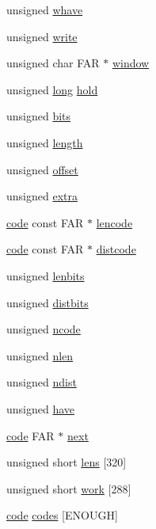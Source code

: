 \begin{DoxyCompactItemize}
unsigned \hyperlink{structinflate__state_a6b56aabe80412784eadc1068981c9d00}{whave}
\item 
unsigned \hyperlink{structinflate__state_a8b89588c1a322e622ebb694d8daa644c}{write}
\item 
unsigned char F\-A\-R $\ast$ \hyperlink{structinflate__state_a9cc4c0bde426383731394dcf91c40673}{window}
\item 
unsigned \hyperlink{ioapi_8h_a3c7b35ad9dab18b8310343c201f7b27e}{long} \hyperlink{structinflate__state_a5a91b1c59e52f1aa7eda75b86b05b843}{hold}
\item 
unsigned \hyperlink{structinflate__state_ab37c3563f306f29e6ded8e933af14365}{bits}
\item 
unsigned \hyperlink{structinflate__state_a5179d4c9b332d976cce7c6cce6bdf3c1}{length}
\item 
unsigned \hyperlink{structinflate__state_af1e38258e8585b1a37854066ef9d939c}{offset}
\item 
unsigned \hyperlink{structinflate__state_a5b7b0be77d61e8468716c7f265dd0780}{extra}
\item 
\hyperlink{structcode}{code} const F\-A\-R $\ast$ \hyperlink{structinflate__state_a4560e1eb3318f7ea41896be84de0679a}{lencode}
\item 
\hyperlink{structcode}{code} const F\-A\-R $\ast$ \hyperlink{structinflate__state_a19f7ae2fe2682cb1163860f6991a107f}{distcode}
\item 
unsigned \hyperlink{structinflate__state_a3ff97e6b230d7551fc848ff9de0236e9}{lenbits}
\item 
unsigned \hyperlink{structinflate__state_a98952f3f8f420a05b567f080aca0eb4b}{distbits}
\item 
unsigned \hyperlink{structinflate__state_a62b5ea8559856b315b6c89d9114c2109}{ncode}
\item 
unsigned \hyperlink{structinflate__state_a489b005f4fe214353cd80b77b4f23194}{nlen}
\item 
unsigned \hyperlink{structinflate__state_a4415e5e51efdd0c8672e4c601caa4762}{ndist}
\item 
unsigned \hyperlink{structinflate__state_a4a2b15912256bcf7b39980e15095ba58}{have}
\item 
\hyperlink{structcode}{code} F\-A\-R $\ast$ \hyperlink{structinflate__state_a872bf267d91efb4143e9cfb812e670bb}{next}
\item 
unsigned short \hyperlink{structinflate__state_aa0620e64487c48635f6c3a11a0aeb99d}{lens} \mbox{[}320\mbox{]}
\item 
unsigned short \hyperlink{structinflate__state_a85403907f7f5b9d355821ffa2591456c}{work} \mbox{[}288\mbox{]}
\item 
\hyperlink{structcode}{code} \hyperlink{structinflate__state_af9581f523a7d8d47fba6cdd73eaf1edc}{codes} \mbox{[}E\-N\-O\-U\-G\-H\mbox{]}
\end{DoxyCompactItemize}


